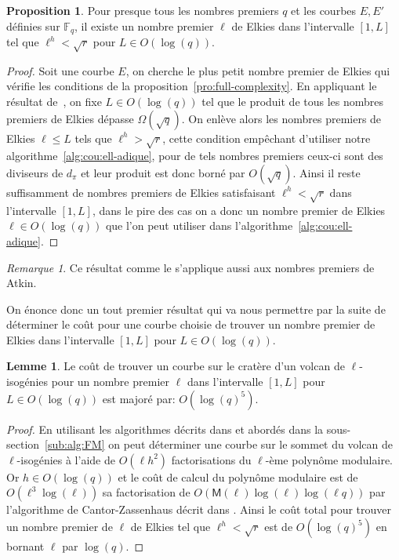 \documentclass[10pt,a4paper]{book}
\theoremstyle{plain}
\theoremstyle{definition}
\theoremstyle{definition}
\newtheorem{lem}[thm]{Lemme}
\theoremstyle{definition}
\theoremstyle{definition}
\newtheorem{prop}[thm]{Proposition}
\theoremstyle{definition}
\theoremstyle{remark}
\newtheorem{rem}[thm]{Remarque}
\theoremstyle{remark}
\theoremstyle{definition}
\begin{document}
\begin{prop}
\label{pro:bor:ell}
Pour presque tous les nombres premiers $q$ et les courbes $E,E'$ définies sur 
$\mathbb{F}_q$, il existe un nombre premier $\ell$ de Elkies 
dans l'intervalle $[1,L]$ tel que $\ell^h < \sqrt{r}$ pour $L \in O(\log(q))$.
\end{prop}

\begin{proof}
Soit une courbe $E$, on cherche le plus petit nombre premier de Elkies qui 
  vérifie les conditions de la proposition~\ref{pro:full-complexity}.
  En appliquant le résultat de~\cite[Theorem~1]{ShparlinskiSutherland14},
  on fixe $L \in O(\log(q))$ tel que le produit de tous les nombres premiers 
  de Elkies dépasse $\Omega(\sqrt{q})$. On enlève alors les nombres premiers 
  de Elkies $\ell \leqslant L$ tels que $\ell^{h} > \sqrt{r}$, cette condition
  empêchant d'utiliser notre algorithme~\ref{alg:cou:ell-adique}, 
  pour de tels nombres premiers ceux-ci sont des diviseurs de $d_{\pi}$ et leur 
  produit est donc borné par $O(\sqrt{q})$. Ainsi il reste suffisamment de 
  nombres premiers de Elkies satisfaisant $\ell^{h} < \sqrt{r}$ dans 
  l'intervalle  $[1,L]$, dans le pire des cas on a donc un nombre premier de
  Elkies $\ell \in O(\log(q))$ que l'on peut utiliser dans 
  l'algorithme~\ref{alg:cou:ell-adique}.
\end{proof}

\begin{rem}
Ce résultat comme le \cite[Theorem~1]{ShparlinskiSutherland14} s'applique aussi
aux nombres premiers de Atkin.
\end{rem}

On énonce donc un tout premier résultat qui va nous permettre par la suite de
déterminer le coût pour une courbe choisie de trouver un nombre premier de 
Elkies dans l'intervalle $[1,L]$ pour $L \in O(\log(q))$.
\begin{lem}
\label{lem:cou:dec}
Le coût de trouver un courbe sur le cratère d'un volcan de $\ell$-isogénies 
pour un nombre premier $\ell$ dans l'intervalle $[1,L]$ pour $L \in O(\log(q))$
est majoré par: $O(\log(q)^5)$.
\end{lem}

\begin{proof}
En utilisant les algorithmes décrits dans \cite{FouquetMorain02} et abordés 
dans la sous-section~\ref{sub:alg:FM} on peut déterminer une courbe sur le 
sommet du volcan de $\ell$-isogénies à l'aide de $O(\ell h^2)$ 
  factorisations du $\ell$-ème polynôme modulaire. Or $h \in O(\log(q))$ et
  le coût de calcul du polynôme modulaire est de $O(\ell^3\log(\ell))$ sa factorisation de 
  $O(\mathsf{M}(\ell)\log(\ell)\log(\ell q))$ par l'algorithme de 
  Cantor-Zassenhaus décrit dans \cite[Chapter~14.5]{vzGJG03}. Ainsi le coût 
  total pour trouver un nombre premier de $\ell$ de Elkies tel que $\ell^h<\sqrt{r}$  est de
  $O(\log(q)^5)$ en bornant $\ell$ par $\log(q)$.
\end{proof}
\end{document}
